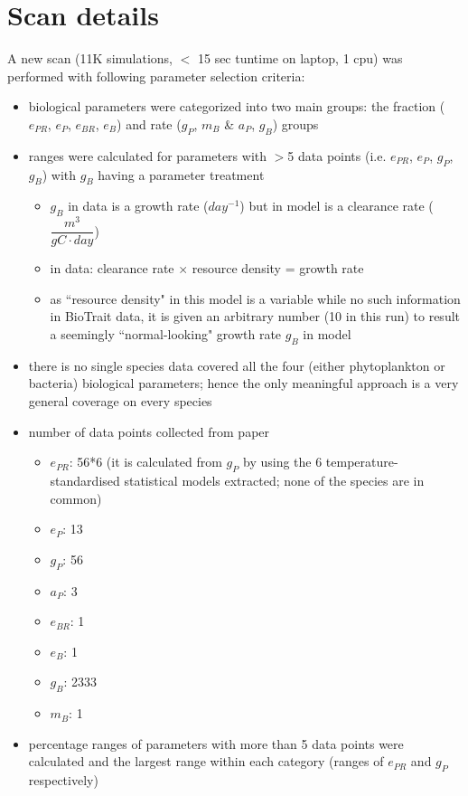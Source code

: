 \documentclass[a4paper]{article}
\newcommand{\ePR}{e_{PR}}
\newcommand{\eP}{e_P}
\newcommand{\gP}{g_P}
\newcommand{\aP}{a_P}
\newcommand{\eBR}{e_{BR}}
\newcommand{\eB}{e_B}
\newcommand{\gB}{g_B}
\newcommand{\mB}{m_B}
\begin{document}
\section{Scan details}
A new scan (11K simulations, $<$ 15 sec tuntime on laptop, 1 cpu) was performed with following parameter selection criteria:
\begin{itemize}
    \item biological parameters were categorized into two main groups: the fraction ($\ePR$, $\eP$, $\eBR$, $\eB$) and rate ($\gP$, $\mB$ \& $\aP$, $\gB$) groups
    \item ranges were calculated for parameters with $>$5 data points (i.e. $\ePR$, $\eP$, $\gP$, $\gB$) with $\gB$ having a parameter treatment
    \begin{itemize}
        \item $\gB$ in data is a growth rate ($day^{-1}$) but in model is a clearance rate ($\dfrac{m^3}{gC\cdot day}$)
        \item in data: clearance rate $\times$ resource density = growth rate
        \item as ``resource density" in this model is a variable while no such information in BioTrait data, it is given an arbitrary number (10 in this run) to result a seemingly ``normal-looking" growth rate $\gB$ in model
    \end{itemize}
    \item there is no single species data covered all the four (either phytoplankton or bacteria) biological parameters; hence the only meaningful approach is a very general coverage on every species
    \item number of data points collected from paper
    \begin{itemize}
        \item $\ePR$: 56*6 (it is calculated from $\gP$ by using the 6 temperature-standardised statistical models extracted; none of the species are in common)
        \item $\eP$: 13
        \item $\gP$: 56
        \item $\aP$: 3
        \item $\eBR$: 1
        \item $\eB$: 1
        \item $\gB$: 2333
        \item $\mB$: 1
    \end{itemize}
    \item percentage ranges of parameters with more than 5 data points were calculated and the largest range within each category (ranges of $\ePR$ and $\gP$ respectively)

\end{itemize}
\end{document}
